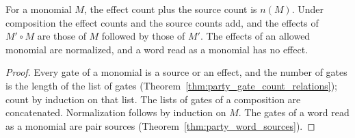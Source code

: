 \begin{theorem}
    \label{thm:party_monomial_effects}
    \leanok
    For a monomial $M$, the effect count plus the source count is $n(M)$. Under
    composition the effect counts and the source counts add, and the effects of
    $M'\circ M$ are those of $M$ followed by those of $M'$. The effects of an allowed
    monomial are normalized, and a word read as a monomial has no effect.
\end{theorem}
\begin{proof}\leanok
    Every gate of a monomial is a source or an effect, and the number of gates is the
    length of the list of gates (Theorem~\ref{thm:party_gate_count_relations}); count
    by induction on that list. The lists of gates of a composition are concatenated.
    Normalization follows by induction on $M$. The gates of a word read as a monomial
    are pair sources (Theorem~\ref{thm:party_word_sources}).
\end{proof}
